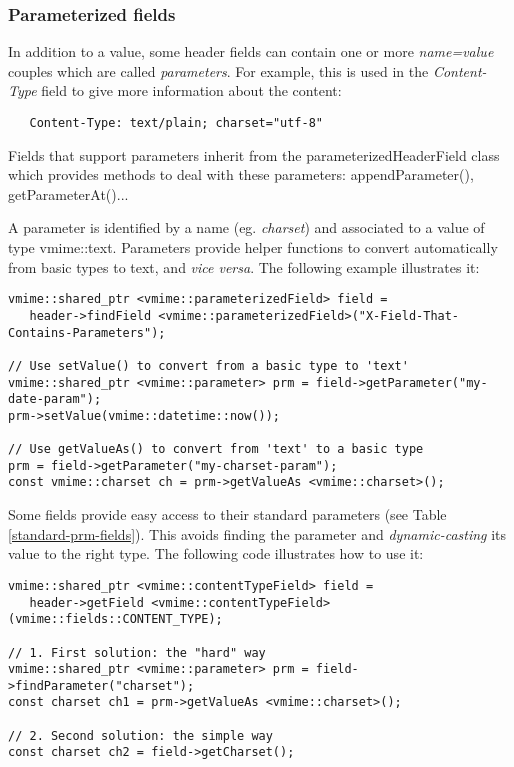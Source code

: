 \subsubsection{Parameterized fields} %

In addition to a value, some header fields can contain one or more
\emph{name=value} couples which are called \emph{parameters}. For example,
this is used in the \emph{Content-Type} field to give more information about
the content:

\begin{verbatim}
   Content-Type: text/plain; charset="utf-8"
\end{verbatim}

Fields that support parameters inherit from the
{\vcode parameterizedHeaderField} class which provides methods to deal with
these parameters: {\vcode appendParameter()}, {\vcode getParameterAt()}...

A parameter is identified by a name (eg. \emph{charset}) and associated to
a value of type {\vcode vmime::text}. Parameters provide helper functions to
convert automatically from basic types to text, and \emph{vice versa}. The
following example illustrates it:

\begin{lstlisting}[caption={Getting and setting parameter value in fields}]
vmime::shared_ptr <vmime::parameterizedField> field =
   header->findField <vmime::parameterizedField>("X-Field-That-Contains-Parameters");

// Use setValue() to convert from a basic type to 'text'
vmime::shared_ptr <vmime::parameter> prm = field->getParameter("my-date-param");
prm->setValue(vmime::datetime::now());

// Use getValueAs() to convert from 'text' to a basic type
prm = field->getParameter("my-charset-param");
const vmime::charset ch = prm->getValueAs <vmime::charset>();
\end{lstlisting}

Some fields provide easy access to their standard parameters (see
Table \ref{standard-prm-fields}). This avoids finding the parameter and
\emph{dynamic-casting} its value to the right type. The following code
illustrates how to use it:

\begin{lstlisting}
vmime::shared_ptr <vmime::contentTypeField> field =
   header->getField <vmime::contentTypeField>(vmime::fields::CONTENT_TYPE);

// 1. First solution: the "hard" way
vmime::shared_ptr <vmime::parameter> prm = field->findParameter("charset");
const charset ch1 = prm->getValueAs <vmime::charset>();

// 2. Second solution: the simple way
const charset ch2 = field->getCharset();
\end{lstlisting}

